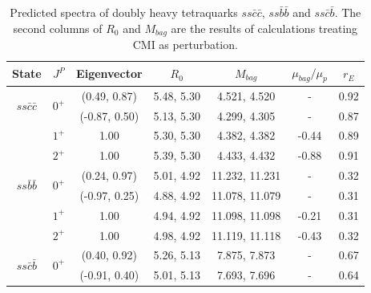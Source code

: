 \documentclass[prd,twocolumn,floatfix,nofootinbib]{revtex4}
\begin{document}
\renewcommand{\tabcolsep}{0.7cm}
\renewcommand{\arraystretch}{1.2}
\begin{table}[!htbp]
    \caption{Predicted spectra of doubly heavy tetraquarks $ss\bar{c}\bar{c}$, $ss\bar{b}\bar{b}$ and $ss\bar{c}\bar{b}$. 
    The second columns of $R_{0}$ and $M_{bag}$ are the results of calculations treating CMI as perturbation. }
    \label{tab:2heavytetraquark0}
    \begin{tabular}{ccccccc}
        \hline\hline
        {\rm State}     &$J^{P}$    &{\rm Eigenvector}      &$R_{0}$    &$M_{bag}$  &$\mu_{bag}/\mu_{p}$    &$r_{E}$ \\ \hline
        \multirow{2}{*}{$ss\bar{c}\bar{c}$}
                        &\multirow{2}{*}{$0^{+}$}
                                    &(0.49, 0.87)           &5.48, 5.30	    &4.521, 4.520	    &-                      &0.92 \\
                        &           &(-0.87, 0.50)          &5.13, 5.30	    &4.299, 4.305	    &-                      &0.87 \\
                        &$1^{+}$    &1.00                   &5.30, 5.30	    &4.382, 4.382	    &-0.44                  &0.89 \\
                        &$2^{+}$    &1.00                   &5.39, 5.30	    &4.433, 4.432	    &-0.88                  &0.91 \\
        \multirow{2}{*}{$ss\bar{b}\bar{b}$}
                        &\multirow{2}{*}{$0^{+}$}
                                    &(0.24, 0.97)           &5.01, 4.92	    &11.232, 11.231	    &-                      &0.32 \\
                        &           &(-0.97, 0.25)          &4.88, 4.92	    &11.078, 11.079	    &-                      &0.31 \\
                        &$1^{+}$    &1.00                   &4.94, 4.92	    &11.098, 11.098	    &-0.21                  &0.31 \\
                        &$2^{+}$    &1.00                   &4.98, 4.92	    &11.119, 11.118	    &-0.43                  &0.32 \\
        \multirow{2}{*}{$ss\bar{c}\bar{b}$}
                        &\multirow{2}{*}{$0^{+}$}
                                    &(0.40, 0.92)           &5.26, 5.13	    &7.875, 7.873	    &-                      &0.67 \\
                        &           &(-0.91, 0.40)          &5.01, 5.13	    &7.693, 7.696	    &-                      &0.64 \\

\end{tabular}
\end{table}
\end{document}
